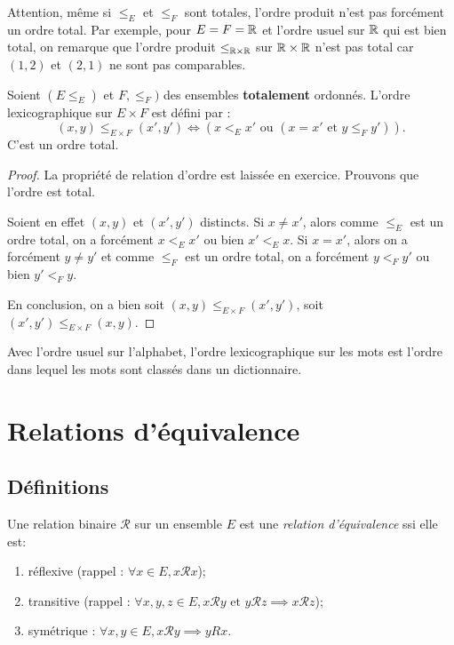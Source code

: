 Attention, même si $\leq_E$ et $\leq_F$ sont totales, l'ordre produit n'est pas forcément un ordre total. Par exemple, pour $E=F=\mathbb{R}$ et l'ordre usuel sur $\mathbb{R}$ qui est bien total, on remarque que l'ordre produit $\leq_{\mathbb{R}\times\mathbb{R}}$ sur $\mathbb{R}\times \mathbb{R}$ n'est pas total car $(1,2)$ et $(2,1)$ ne sont pas comparables.

\begin{propdef}
Soient $(E\leq_E)$ et $F,\leq_F)$ des ensembles \textbf{totalement} ordonnés.
L'ordre lexicographique sur $E\times F$ est défini par :
\[
(x,y) \leq_{E\times F} (x',y') \iff \left(x<_E x' \text{ ou } (x=x' \text{ et } y\leq_F y')\right).
\]
C'est un ordre total.
\end{propdef}
\begin{proof}
La propriété de relation d'ordre est laissée en exercice. Prouvons que l'ordre est total.

Soient en effet $(x,y)$ et $(x',y')$ distincts.
Si $x\neq x'$, alors comme $\leq_E$ est un ordre total, on a forcément $x<_E x'$ ou bien $x'<_E x$.
Si $x=x'$, alors on a forcément $y\neq y'$ et comme $\leq_F$ est un ordre total, on a forcément $y <_F y'$ ou bien $y'<_F y$.

En conclusion, on a bien soit $(x,y) \leq_{E\times F} (x',y')$, soit  $(x',y') \leq_{E\times F} (x,y)$.
\end{proof}

\begin{exemple}Avec l'ordre usuel sur l'alphabet, l'ordre lexicographique sur les mots est l'ordre dans lequel les mots sont classés dans un dictionnaire.
\end{exemple}



\section{Relations d'équivalence}

\subsection{Définitions}

\begin{definition}
Une relation binaire ${\mathcal R}$ sur un ensemble $E$ est une \emph{relation d'équivalence} ssi elle est:
\begin{enumerate}
\item réflexive (rappel : $\forall x\in E, x{\mathcal R}x$);
\item transitive (rappel : $\forall x, y, z\in E, x{\mathcal R}y\text{ et } y{\mathcal R}z \implies x{\mathcal R}z$);
\item symétrique : $\forall x, y\in E, x{\mathcal R}y \implies yRx$.
\end{enumerate}
\end{definition}

